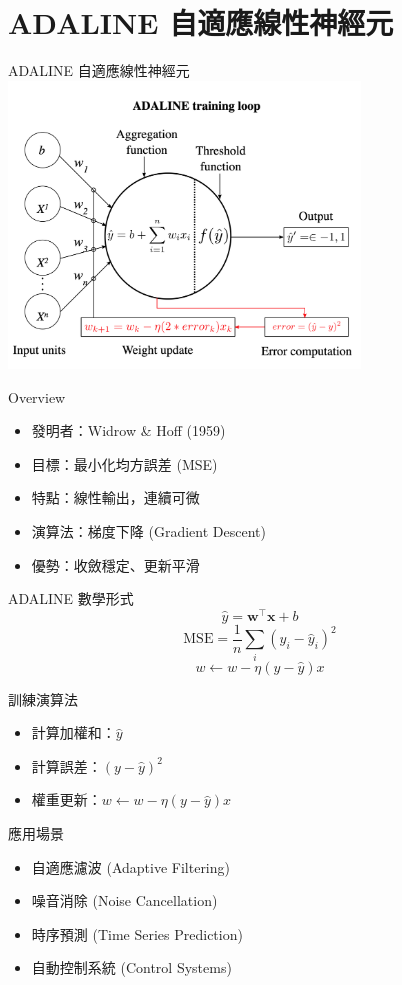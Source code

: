 \documentclass{beamer}
\begin{document}
\section{ADALINE 自適應線性神經元}
\begin{frame}{ADALINE 自適應線性神經元}
  \centering
  \includegraphics[width=0.7\textwidth]{ADALINE_picture.png}
\end{frame}

\begin{frame}{Overview}
  \begin{itemize}
    \item 發明者：Widrow \& Hoff (1959)
    \item 目標：最小化均方誤差 (MSE)
    \item 特點：線性輸出，連續可微
    \item 演算法：梯度下降 (Gradient Descent)
    \item 優勢：收斂穩定、更新平滑
  \end{itemize}
\end{frame}

\begin{frame}{ADALINE 數學形式}
  \[
    \hat y=\mathbf{w}^\top\mathbf{x}+b
  \]
  \[
    \mathrm{MSE}=\frac1n\sum_i(y_i-\hat y_i)^2
  \]
  \[
    w\leftarrow w-\eta(y-\hat y)x
  \]
\end{frame}

\begin{frame}{訓練演算法}
  \begin{itemize}
    \item 計算加權和：$\hat y$
    \item 計算誤差：$(y-\hat y)^2$
    \item 權重更新：$w\leftarrow w-\eta(y-\hat y)x$
  \end{itemize}
\end{frame}

\begin{frame}{應用場景}
  \begin{itemize}
    \item 自適應濾波 (Adaptive Filtering)
    \item 噪音消除 (Noise Cancellation)
    \item 時序預測 (Time Series Prediction)
    \item 自動控制系統 (Control Systems)
  \end{itemize}
\end{frame}
\end{document}
